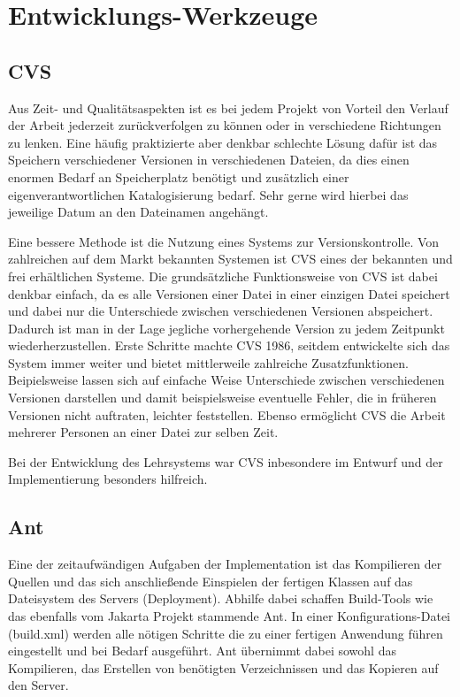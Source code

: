 \section{Entwicklungs-Werkzeuge}

\subsection{CVS}
Aus Zeit- und Qualit\"atsaspekten ist es bei jedem Projekt von Vorteil den Verlauf der Arbeit
jederzeit zur\"uckverfolgen zu k\"onnen oder in verschiedene Richtungen zu lenken. Eine h\"aufig
praktizierte aber denkbar schlechte L\"osung daf\"ur ist das Speichern verschiedener Versionen
in verschiedenen Dateien, da dies einen enormen Bedarf an Speicherplatz ben\"otigt und 
zus\"atzlich einer eigenverantwortlichen Katalogisierung bedarf. Sehr gerne wird hierbei das
jeweilige Datum an den Dateinamen angeh\"angt. 

Eine bessere Methode ist die Nutzung eines Systems zur Versionskontrolle. Von zahlreichen
auf dem Markt bekannten Systemen ist CVS eines der bekannten und frei erh\"altlichen
Systeme. Die grunds\"atzliche Funktionsweise von CVS ist dabei denkbar einfach, da es alle 
Versionen einer Datei in einer einzigen Datei speichert und dabei nur die Unterschiede 
zwischen verschiedenen Versionen abspeichert. Dadurch ist man in der Lage jegliche 
vorhergehende Version zu jedem Zeitpunkt wiederherzustellen. Erste Schritte machte CVS
1986, seitdem entwickelte sich das System immer weiter und bietet mittlerweile zahlreiche
Zusatzfunktionen. Beipielsweise lassen sich auf einfache Weise Unterschiede zwischen
verschiedenen Versionen darstellen und damit beispielsweise eventuelle Fehler, die
in fr\"uheren Versionen nicht auftraten, leichter feststellen. Ebenso erm\"oglicht CVS die
Arbeit mehrerer Personen an einer Datei zur selben Zeit.

Bei der Entwicklung des Lehrsystems war CVS inbesondere im Entwurf und der Implementierung
besonders hilfreich.

\subsection{Ant}

Eine der zeitaufw\"andigen Aufgaben der Implementation ist das Kompilieren der Quellen und das
sich anschlie{\ss}ende Einspielen der fertigen Klassen auf das Dateisystem des Servers (Deployment).
Abhilfe dabei schaffen Build-Tools wie das ebenfalls vom Jakarta Projekt stammende Ant. In einer
Konfigurations-Datei (build.xml) werden alle n\"otigen Schritte die zu einer fertigen Anwendung
f\"uhren eingestellt und bei Bedarf ausgef\"uhrt. Ant \"ubernimmt dabei sowohl das Kompilieren, das
Erstellen von ben\"otigten Verzeichnissen und das Kopieren auf den Server.


